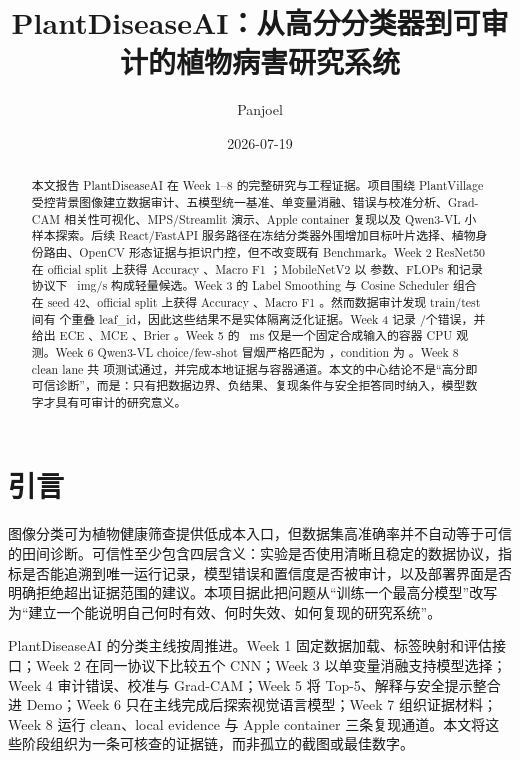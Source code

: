 \documentclass[UTF8,11pt]{ctexart}
\title{PlantDiseaseAI：从高分分类器到可审计的植物病害研究系统}
\author{Panjoel}
\date{2026-07-19}
\begin{document}
\maketitle

\begin{abstract}
本文报告 PlantDiseaseAI 在 Week 1--8 的完整研究与工程证据。项目围绕 PlantVillage 受控背景图像建立数据审计、五模型统一基准、单变量消融、错误与校准分析、Grad-CAM 相关性可视化、MPS/Streamlit 演示、Apple container 复现以及 Qwen3-VL 小样本探索。后续 React/FastAPI 服务路径在冻结分类器外围增加目标叶片选择、植物身份路由、OpenCV 形态证据与拒识门控，但不改变既有 Benchmark。Week 2 ResNet50 在 official split 上获得 Accuracy \PDAWeekTwoAccuracy、Macro F1 \PDAWeekTwoMacroFOne；MobileNetV2 以 \PDAMobileParams 参数、\PDAMobileFlops FLOPs 和记录协议下 \PDAMobileThroughput~img/s 构成轻量候选。Week 3 的 Label Smoothing 与 Cosine Scheduler 组合在 seed 42、official split 上获得 Accuracy \PDAFinalAccuracy、Macro F1 \PDAFinalMacroFOne。然而数据审计发现 train/test 间有 \PDAOfficialOverlap 个重叠 leaf\_id，因此这些结果不是实体隔离泛化证据。Week 4 记录 \PDAErrorCount/\PDATestCount 个错误，并给出 ECE \PDAECE、MCE \PDAMCE、Brier \PDABrier。Week 5 的 \PDADemoLatency~ms 仅是一个固定合成输入的容器 CPU 观测。Week 6 Qwen3-VL choice/few-shot 冒烟严格匹配为 \PDAVLMChoice，condition 为 \PDAVLMCondition。Week 8 clean lane 共 \PDAWeekEightCleanTests 项测试通过，并完成本地证据与容器通道。本文的中心结论不是“高分即可信诊断”，而是：只有把数据边界、负结果、复现条件与安全拒答同时纳入，模型数字才具有可审计的研究意义。
\end{abstract}

\section{引言}

图像分类可为植物健康筛查提供低成本入口，但数据集高准确率并不自动等于可信的田间诊断。可信性至少包含四层含义：实验是否使用清晰且稳定的数据协议，指标是否能追溯到唯一运行记录，模型错误和置信度是否被审计，以及部署界面是否明确拒绝超出证据范围的建议。本项目据此把问题从“训练一个最高分模型”改写为“建立一个能说明自己何时有效、何时失效、如何复现的研究系统”。

PlantDiseaseAI 的分类主线按周推进。Week 1 固定数据加载、标签映射和评估接口；Week 2 在同一协议下比较五个 CNN；Week 3 以单变量消融支持模型选择；Week 4 审计错误、校准与 Grad-CAM；Week 5 将 Top-5、解释与安全提示整合进 Demo；Week 6 只在主线完成后探索视觉语言模型；Week 7 组织证据材料；Week 8 运行 clean、local evidence 与 Apple container 三条复现通道。本文将这些阶段组织为一条可核查的证据链，而非孤立的截图或最佳数字。
\end{document}
